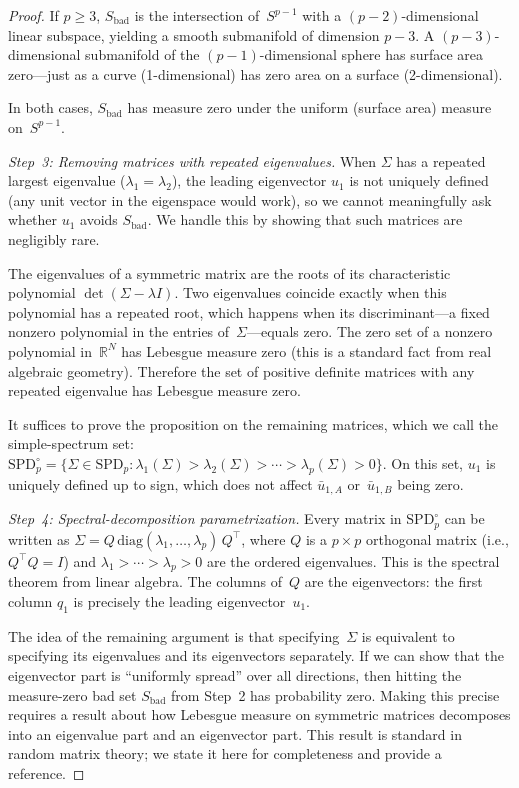 \documentclass[hidelinks]{siamart251216}
\newcommand{\R}{\mathbb{R}}
\begin{document}
\begin{proof}
  If $p \ge 3$, $S_{\mathrm{bad}}$ is the intersection of~$S^{p-1}$
  with a $(p - 2)$-dimensional linear subspace, yielding a smooth
  submanifold of dimension $p - 3$.  A $(p-3)$-dimensional submanifold
  of the $(p-1)$-dimensional sphere has surface area zero---just as a
  curve (1-dimensional) has zero area on a surface (2-dimensional).

  In both cases, $S_{\mathrm{bad}}$ has measure zero under the uniform
  (surface area) measure on~$S^{p-1}$.

  \emph{Step~3: Removing matrices with repeated eigenvalues.}
  When $\Sigma$ has a repeated largest eigenvalue
  ($\lambda_1 = \lambda_2$), the leading eigenvector $u_1$ is not
  uniquely defined (any unit vector in the eigenspace would work), so
  we cannot meaningfully ask whether $u_1$ avoids $S_{\mathrm{bad}}$.
  We handle this by showing that such matrices are negligibly rare.

  The eigenvalues of a symmetric matrix are the roots of its
  characteristic polynomial $\det(\Sigma - \lambda I)$.  Two
  eigenvalues coincide exactly when this polynomial has a repeated
  root, which happens when its discriminant---a fixed nonzero polynomial
  in the entries of~$\Sigma$---equals zero.  The zero set of a nonzero
  polynomial in~$\R^N$ has Lebesgue measure zero (this is a standard
  fact from real algebraic geometry).  Therefore the set of positive
  definite matrices with any repeated eigenvalue has Lebesgue measure
  zero.

  It suffices to prove the proposition on the remaining matrices, which
  we call the simple-spectrum set:
  $\mathrm{SPD}_p^\circ = \{ \Sigma \in \mathrm{SPD}_p :
  \lambda_1(\Sigma) > \lambda_2(\Sigma) > \cdots > \lambda_p(\Sigma)
  > 0 \}$.  On this set, $u_1$ is uniquely defined up to sign, which
  does not affect $\bar{u}_{1,A}$ or~$\bar{u}_{1,B}$ being zero.

  \emph{Step~4: Spectral-decomposition parametrization.}
  Every matrix in $\mathrm{SPD}_p^\circ$ can be written as
  $\Sigma = Q\, \mathrm{diag}(\lambda_1, \ldots, \lambda_p)\, Q^\top$,
  where $Q$ is a $p \times p$ orthogonal matrix (i.e., $Q^\top Q = I$)
  and $\lambda_1 > \cdots > \lambda_p > 0$ are the ordered eigenvalues.
  This is the spectral theorem from linear algebra.  The columns of~$Q$
  are the eigenvectors: the first column $q_1$ is precisely the leading
  eigenvector~$u_1$.

  The idea of the remaining argument is that specifying~$\Sigma$ is
  equivalent to specifying its eigenvalues and its eigenvectors
  separately.  If we can show that the eigenvector part is ``uniformly
  spread'' over all directions, then hitting the measure-zero bad set
  $S_{\mathrm{bad}}$ from Step~2 has probability zero.  Making this
  precise requires a result about how Lebesgue measure on symmetric
  matrices decomposes into an eigenvalue part and an eigenvector part.
  This result is standard in random matrix theory; we state it here
  for completeness and provide a reference.


\end{proof}
\end{document}
